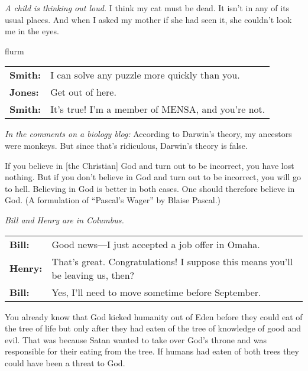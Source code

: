 \begin{exercises}
\item \textit{A child is thinking out loud. }I think my cat must be dead. It isn't in any of its usual places. And when I asked my mother if she had seen it, she couldn't look me in the eyes. 

\item {\color{white}flurm}
\vspace{-24pt}
\begin{adjustwidth}{2em}{0em}
\begin{longtabu}{p{.1\linewidth}p{.8\linewidth}}
\textbf{Smith:} & I can solve any puzzle more quickly than you.\\
\textbf{Jones:}& Get out of here. \\
\textbf{Smith:} & It's true! I'm a member of MENSA, and you're not. 
\end{longtabu}
\end{adjustwidth}
\vspace{-.9cm}

\item \textit{In the comments on a biology blog: }According to Darwin's theory, my ancestors were monkeys. But since that's ridiculous, Darwin's theory is false. 

\item If you believe in [the Christian] God and turn out to be incorrect, you have lost nothing. But if you don't believe in God and turn out to be incorrect, you will go to hell. Believing in God is better in both cases. One should therefore believe in God. (A formulation of ``Pascal's Wager'' by Blaise Pascal.) 

\item \textit{Bill and Henry are in Columbus.}
\vspace{-8pt}
\begin{adjustwidth}{2em}{0em}
\begin{longtabu}{p{.1\linewidth}p{.8\linewidth}}
\textbf{Bill:} & Good news---I just accepted a job offer in Omaha. \\
\textbf{Henry:} & That's great. Congratulations! I suppose this means you'll be leaving us, then?\\
\textbf{Bill:} & Yes, I'll need to move sometime before September.  \\
\end{longtabu}
\end{adjustwidth}
\vspace{-.9cm}

\item You already know that God kicked humanity out of Eden before they could eat of the tree of life but only after they had eaten of the tree of knowledge of good and evil. That was because Satan wanted to take over God's throne and was responsible for their eating from the tree. If humans had eaten of both trees they could have been a threat to God. 

\end{exercises}

